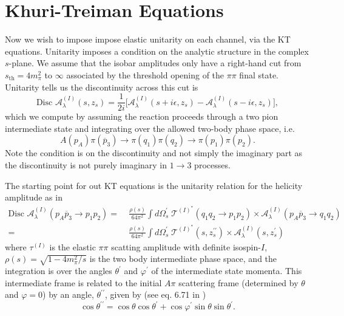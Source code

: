 \documentclass[10pt, aps,prd,amsmath,amssymb,superscriptaddress,onecolumn,
nofootinbib,showpacs,preprintnumbers]{revtex4-1}
\newcommand{\Disc}{\text{Disc }}
\begin{document}
\section{Khuri-Treiman Equations} \label{sec:unitarity}

Now we wish to impose impose elastic unitarity on each channel, via the KT equations.
Unitarity imposes a condition on the analytic structure in the complex \(s\)-plane. We assume that the isobar amplitudes only have a right-hand cut from \(s_\text{th} = 4m_\pi^2\) to \(\infty\) associated by the threshold opening of the \(\pi\pi\) final state. Unitarity tells us the discontinuity across this cut is
  \begin{equation}
      \Disc \mathcal{A}^{(I)}_\lambda(s,z_s) = \frac{1}{2i} \bigg[ \mathcal{A}^{(I)}_\lambda(s + i\epsilon, z_s) - \mathcal{A}^{(I)}_\lambda(s-i\epsilon,z_s) \bigg],
  \end{equation}
which we compute by assuming the reaction proceeds through a two pion intermediate state and integrating over the allowed two-body phase space, i.e.
  \begin{equation}
    A(p_A) \pi(\overline{p}_3) \rightarrow \pi(q_1)\pi(q_2) \to \pi(p_1) \pi(p_2).
  \end{equation}
Note the condition is on the discontinuity and not simply the imaginary part as the discontinuity is not purely imaginary in \(1 \to 3\) processes.

The starting point for out KT equations is the unitarity relation for the helicity amplitude as in \cite{Danilkin:2014cra}
  \begin{align}
    \label{eq:unitarity}
    \Disc \mathcal{A}^{(I)}_\lambda(p_A \overline{p}_3 \to p_1 p_2 ) =&\; \frac{\rho(s)}{64 \pi^2} \int d\Omega_s^\prime  \; {\mathcal{T}}^{(I)^*}(q_1q_2 \to p_1p_2) \times \mathcal{A}^{(I)}_\lambda(p_A \overline{p}_{3} \to q_1 q_2 ) \nonumber \\
    =& \; \frac{\rho(s)}{64 \pi^2} \int d\Omega_s^\prime  \; {\mathcal{T}}^{(I)^*}(s,z_s^{\prime\prime}) \times \mathcal{A}^{(I)}_\lambda(s,z_s^{\prime})
  \end{align}
where \({\tau^{(I)}}\) is the elastic \(\pi\pi\) scatting amplitude with definite isospin-\(I\), \(\rho(s) = \sqrt{1 - 4m_\pi^2/s}\) is the two body intermediate phase space, and the integration is over the angles \(\theta^\prime\) and \(\varphi^\prime\) of the intermediate state momenta. This intermediate frame is related to the initial \(A\pi\) scattering frame (determined by \(\theta\) and \(\varphi = 0\)) by an angle, \(\theta^{\prime\prime}\), given by (see eq. 6.71 in \cite{MS})
  \begin{equation}
    \cos \theta^{\prime\prime} = \cos \theta \cos \theta^\prime + \cos \varphi^\prime \sin\theta \sin \theta^\prime.
  \end{equation}
\end{document}
